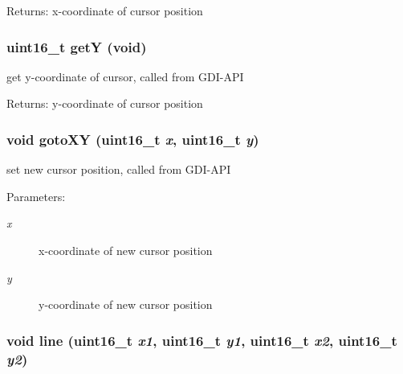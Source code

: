 \begin{Desc}
\item[Returns:]x-coordinate of cursor position \end{Desc}
\hypertarget{group__graphic__device_g32fe0e72f29aeb9a8285f00cfbe59957}{
\subsubsection[{getY}]{\setlength{\rightskip}{0pt plus 5cm}uint16\_\-t getY (void)}}
\label{group__graphic__device_g32fe0e72f29aeb9a8285f00cfbe59957}


get y-coordinate of cursor, called from GDI-API 

\begin{Desc}
\item[Returns:]y-coordinate of cursor position \end{Desc}
\hypertarget{group__graphic__device_g7551aae0561930d02c9981917c4d9d9b}{
\subsubsection[{gotoXY}]{\setlength{\rightskip}{0pt plus 5cm}void gotoXY (uint16\_\-t {\em x}, \/  uint16\_\-t {\em y})}}
\label{group__graphic__device_g7551aae0561930d02c9981917c4d9d9b}


set new cursor position, called from GDI-API 

\begin{Desc}
\item[Parameters:]
\begin{description}
\item[{\em x}]x-coordinate of new cursor position \item[{\em y}]y-coordinate of new cursor position \end{description}
\end{Desc}
\hypertarget{group__graphic__device_gbae4230e0d7bc64a2f8fba6c6175eb87}{
\subsubsection[{line}]{\setlength{\rightskip}{0pt plus 5cm}void line (uint16\_\-t {\em x1}, \/  uint16\_\-t {\em y1}, \/  uint16\_\-t {\em x2}, \/  uint16\_\-t {\em y2})}}
\label{group__graphic__device_gbae4230e0d7bc64a2f8fba6c6175eb87}


